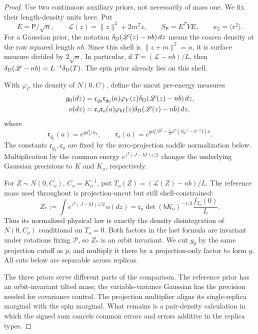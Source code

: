 \begin{proof}
Use two continuous auxiliary priors, not necessarily of mass one.
We fix their length-density units here. Put
\[
 E=\mathsf P/\sqrt n,\qquad
 \mathscr L(z)=\|z\|^2+2m^Tz,\qquad
 S_{\mathsf P}=E^TVE,\qquad \kappa_2=\langle v^2\rangle.
\]
For a Gaussian prior, the notation
\(\delta_{\rm D}(\mathscr L(z)-nb)\,dz\) means the coarea density
at the raw squared length \(nb\). Since this shell is
\(\|z+m\|^2=n\), it is surface measure divided by \(2\sqrt n\).
In particular, if \(T=(\mathscr L-nb)/L\), then
\(\delta_{\rm D}(\mathscr L-nb)=L^{-1}\delta_{\rm D}(T)\).
The spin prior already lies on this shell.

With \(\varphi_C\) the density of \(N(0,C)\), define the uncut
pre-energy measures
\[
\begin{split}
 g_0(dz)&=\mathfrak c_{g_0}\mathfrak r_{g_0}(a)
       \varphi_V(z)\delta_{\rm D}(\mathscr L(z)-nb)\,dz,\\
 o(dz)&=\mathfrak c_o\mathfrak r_o(a)
       \varphi_{bI}(z)\delta_{\rm D}(\mathscr L(z)-nb)\,dz,
\end{split}
\]
where
\[
 \mathfrak r_{g_0}(a)=e^{qa_1^2/\kappa_2},\qquad
 \mathfrak r_o(a)=
 e^{qa_1^2/b^2-\frac12a^T(S_{\mathsf P}^{-1}-b^{-1}I)a}.
\]
The constants \(\mathfrak c_{g_0},\mathfrak c_o\) are fixed by
the zero-projection saddle normalization below. Multiplication by
the common energy \(e^{z^T(J-bI)z/2}\) changes the underlying
Gaussian precisions to \(K\) and \(K_o\), respectively.

For \(Z\sim N(0,C_o)\), \(C_o=K_o^{-1}\), put
\(T_o(Z)=(\mathscr L(Z)-nb)/L\). The reference mass used
throughout is projection-uncut but still shell-constrained:
\[
 Z_*:=\int e^{z^T(J-bI)z/2}\,o(dz)
 =\mathfrak c_o\det(bK_o)^{-1/2}\frac{f_{T_o}(0)}{L}.
\]
Thus its normalized physical law is exactly the density
disintegration of \(N(0,C_o)\) conditional on \(T_o=0\).
Both factors in the last formula are invariant under rotations
fixing \(\mathcal P\), so \(Z_*\) is an orbit invariant.
We cut \(g_0\) by the same projection cutoff as \(p\), and multiply
it there by a projection-only factor to form \(g\). All cuts below
are separable across replicas.

The three priors serve different parts of the comparison. The reference
prior has an orbit-invariant tilted mass; the variable-variance Gaussian
has the precision needed for covariance control. The projection
multiplier aligns its single-replica marginal with the spin marginal.
What remains is a pair-density calculation in which the signed sum
cancels common errors and errors additive in the replica types.


\end{proof}
